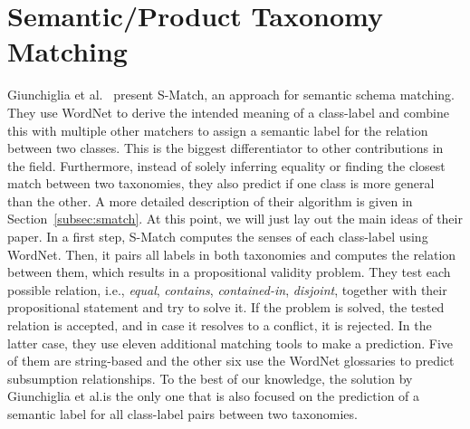 \section{Semantic/Product Taxonomy Matching}

Giunchiglia et al.\@~\cite{giunchiglia2005semantic} present S-Match, an approach for semantic schema matching.
They use WordNet to derive the intended meaning of a class-label and combine this with multiple other matchers
to assign a semantic label for the relation between two classes.
This is the biggest differentiator to other contributions in the field.
Furthermore, instead of solely inferring equality or finding the closest match between two taxonomies,
they also predict if one class is more general than the other.
A more detailed description of their algorithm is given in Section~\ref{subsec:smatch}.
At this point, we will just lay out the main ideas of their paper.
In a first step, S-Match computes the senses of each class-label using WordNet.
Then, it pairs all labels in both taxonomies and computes the relation between them, which results in a propositional
validity problem.
They test each possible relation, i.e., \emph{equal}, \emph{contains}, \emph{contained-in}, \emph{disjoint}, together with their propositional
statement and try to solve it.
If the problem is solved, the tested relation is accepted, and in case it resolves to a conflict, it is rejected.
In the latter case, they use eleven additional matching tools to make a prediction.
Five of them are string-based and the other six use the WordNet glossaries to predict subsumption relationships.
To the best of our knowledge, the solution by Giunchiglia et al.\@ is the only one that is also focused on the prediction of a
semantic label for all class-label pairs between two taxonomies.

